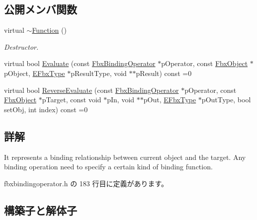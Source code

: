 \subsection*{公開メンバ関数}
\begin{DoxyCompactItemize}
\item 
virtual \hyperlink{class_fbx_binding_operator_1_1_function_a87c75b7d2a19945c11161104691294c9}{$\sim$\+Function} ()
\begin{DoxyCompactList}\small\item\em Destructor. \end{DoxyCompactList}\item 
virtual bool \hyperlink{class_fbx_binding_operator_1_1_function_aa238a63d12508db3cb5c00a4b157524e}{Evaluate} (const \hyperlink{class_fbx_binding_operator}{Fbx\+Binding\+Operator} $\ast$p\+Operator, const \hyperlink{class_fbx_object}{Fbx\+Object} $\ast$p\+Object, \hyperlink{fbxpropertytypes_8h_a73913a5ddfb20e57c6f25e9e6784bd92}{E\+Fbx\+Type} $\ast$p\+Result\+Type, void $\ast$$\ast$p\+Result) const =0
\item 
virtual bool \hyperlink{class_fbx_binding_operator_1_1_function_a9bbeec993a6e453a6569e7f40a85fd52}{Reverse\+Evaluate} (const \hyperlink{class_fbx_binding_operator}{Fbx\+Binding\+Operator} $\ast$p\+Operator, const \hyperlink{class_fbx_object}{Fbx\+Object} $\ast$p\+Target, const void $\ast$p\+In, void $\ast$$\ast$p\+Out, \hyperlink{fbxpropertytypes_8h_a73913a5ddfb20e57c6f25e9e6784bd92}{E\+Fbx\+Type} $\ast$p\+Out\+Type, bool set\+Obj, int index) const =0
\end{DoxyCompactItemize}


\subsection{詳解}
It represents a binding relationship between current object and the target. Any binding operation need to specify a certain kind of binding function. 

 fbxbindingoperator.\+h の 183 行目に定義があります。



\subsection{構築子と解体子}
\mbox{\label{class_fbx_binding_operator_1_1_function_a87c75b7d2a19945c11161104691294c9}} 

